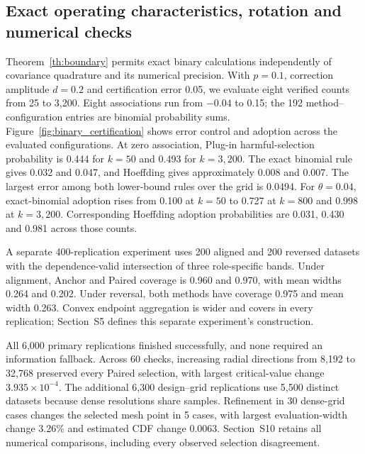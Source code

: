 \subsection{Exact operating characteristics, rotation and numerical checks}
Theorem~\ref{th:boundary} permits exact binary calculations independently of covariance quadrature and its numerical precision.
With $p=0.1$, correction amplitude $d=0.2$ and certification error 0.05, we evaluate eight verified counts from 25 to 3,200.
Eight associations run from $-0.04$ to 0.15; the 192 method--configuration entries are binomial probability sums.
Figure~\ref{fig:binary_certification} shows error control and adoption across the evaluated configurations.
At zero association, Plug-in harmful-selection probability is 0.444 for $k=50$ and 0.493 for $k=3,200$.
The exact binomial rule gives 0.032 and 0.047, and Hoeffding gives approximately 0.008 and 0.007.
The largest error among both lower-bound rules over the grid is 0.0494.
For $\theta=0.04$, exact-binomial adoption rises from 0.100 at $k=50$ to 0.727 at $k=800$ and 0.998 at $k=3,200$.
Corresponding Hoeffding adoption probabilities are 0.031, 0.430 and 0.981 across those counts.



A separate 400-replication experiment uses 200 aligned and 200 reversed datasets with the dependence-valid intersection of three role-specific bands.
Under alignment, Anchor and Paired coverage is 0.960 and 0.970, with mean widths 0.264 and 0.202.
Under reversal, both methods have coverage 0.975 and mean width 0.263.
Convex endpoint aggregation is wider and covers in every replication; Section~S5 defines this separate experiment's construction.

All 6,000 primary replications finished successfully, and none required an information fallback.
Across 60 checks, increasing radial directions from 8,192 to 32,768 preserved every Paired selection, with largest critical-value change $3.935\times10^{-4}$.
The additional 6,300 design--grid replications use 5,500 distinct datasets because dense resolutions share samples.
Refinement in 30 dense-grid cases changes the selected mesh point in 5 cases, with largest evaluation-width change 3.26\% and estimated CDF change 0.0063.
Section~S10 retains all numerical comparisons, including every observed selection disagreement.
